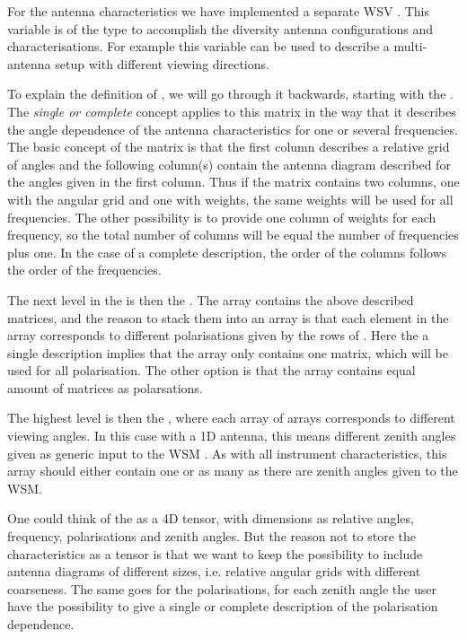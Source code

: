 For the antenna characteristics we have implemented a separate WSV 
. This variable is of the type 
 to accomplish the diversity antenna
configurations and characterisations. For example this variable can 
be used to describe a multi-antenna setup with different viewing 
directions.

To explain the definition of , we will go through it backwards, starting with the . The \textit{single or complete} concept applies to this matrix in the way that it describes the angle dependence of the antenna characteristics for one or several frequencies. The basic concept of the matrix is that the first column describes a relative grid of angles and the following column(s) contain the antenna diagram described for the angles given in the first column. Thus if the matrix contains two columns, one with the angular grid and one with weights, the same weights will be used for all frequencies. The other possibility is to provide one column of weights for each frequency, so the total number of columns will be equal the number of frequencies plus one. In the case of a complete description, the order of the columns follows the order of the frequencies.

The next level in the  is then the . The array contains the above described matrices, and the reason to stack them into an array is that each element in the array corresponds to different polarisations given by the rows of . Here the a single description implies that the array only contains one matrix, which will be used for all polarisation. The other option is that the array contains equal amount of matrices as polarsations.

The highest level is then the , where each array of arrays corresponds to different viewing angles. In this case with a 1D antenna, this means different zenith angles given as generic input to the WSM . As with all instrument characteristics, this array should either contain one  or as many as there are zenith angles given to the WSM.

One could think of the  as a 4D tensor, with dimensions as relative angles, frequency, polarisations and zenith angles. But the reason not to store the characteristics as a tensor is that we want to keep the possibility to include antenna diagrams of different sizes, i.e. relative angular grids with different coarseness. The same goes for the polarisations, for each zenith angle the user have the possibility to give a single or complete description of the polarisation dependence.

